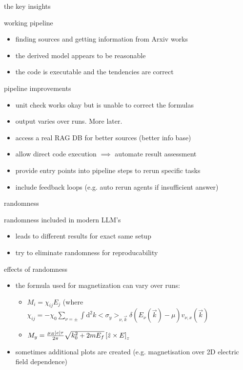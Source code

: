 \documentclass[t]{beamer}
\numberwithin{equation}{section}
\begin{document}
	\begin{frame}[c]{the key insights}
		\begin{block}{working pipeline}
			\begin{itemize}
				\item finding sources and getting information from Arxiv works
				\item the derived model appears to be reasonable
				\item the code is executable and the tendencies are correct
			\end{itemize}
		\end{block}
		\pause
		\begin{alertblock}{pipeline improvements}
			\begin{itemize}
				\item {\color{blue}unit check works okay but is unable to correct the formulas}
				\item {\color{blue}output varies over runs. More later.}\pause
				\item access a real RAG DB for better sources (better info base)
				\item allow direct code execution $\implies$ automate result assessment
				\item provide entry points into pipeline steps to rerun specific tasks
				\item include feedback loops (e.g. auto rerun agents if insufficient answer)
			\end{itemize}
		\end{alertblock}		
	\end{frame}
	
	\begin{frame}[c]{randomness}
		\begin{block}{randomness}
			included in modern LLM's
			\begin{itemize}
				\item leads to different results for exact same setup
				\item try to eliminate randomness for reproducability
			\end{itemize}
		\end{block}\pause
		
		\begin{exampleblock}{effects of randomness}
			\begin{itemize}
				\item the formula used for magnetization can vary over runs:
				\begin{itemize}
					\item $M_i = \chi_{ij}E_j$ (where $\chi_{ij} = -\chi_0 \sum_{\nu = \pm} \int \mathrm{d}^2k <\sigma_y>_{\nu,\vec{k}} \delta(E_\nu(\vec{k}) - \mu)v_{\nu,x}(\vec{k})$
					\item[or] $M_y = \frac{\mu_B \abs{e} \tau}{2 \pi} \sqrt{k_0^2 + 2mE_f}\left[\hat{z} \times {\boldmath E}\right]_z$
				\end{itemize}
				\item sometimes additional plots are created (e.g. magnetisation over 2D electric field dependence)
			\end{itemize}
		\end{exampleblock}		
	\end{frame}
	
\end{document}
